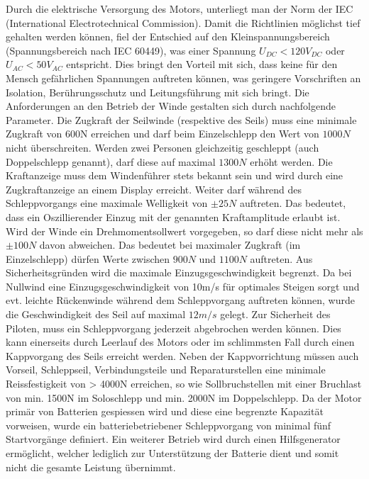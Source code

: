 Durch die elektrische Versorgung des Motors, unterliegt man der Norm der IEC (International Electrotechnical Commission). Damit die Richtlinien möglichst tief gehalten werden können, fiel der Entschied auf den Kleinspannungsbereich (Spannungsbereich  nach IEC 60449), was einer Spannung $U_{DC}<120V_{DC}$ oder $U_{AC}<50V_{AC}$ entspricht. Dies bringt den Vorteil mit sich, dass keine für den Mensch gefährlichen Spannungen auftreten können, was geringere Vorschriften an Isolation, Berührungsschutz und Leitungsführung mit sich bringt.
Die Anforderungen an den Betrieb der Winde gestalten sich durch nachfolgende Parameter. Die Zugkraft der Seilwinde (respektive des Seils) muss eine minimale Zugkraft von 600N erreichen und darf beim Einzelschlepp den Wert von $ 1000N $ nicht überschreiten. Werden zwei Personen gleichzeitig geschleppt (auch Doppelschlepp genannt), darf diese auf maximal $ 1300N $ erhöht werden. Die Kraftanzeige muss dem Windenführer stets bekannt sein und wird durch eine Zugkraftanzeige an einem Display erreicht.
Weiter darf während des Schleppvorgangs eine maximale Welligkeit von $\pm 25N$ auftreten. Das bedeutet, dass ein Oszillierender Einzug mit der genannten Kraftamplitude erlaubt ist. Wird der Winde ein Drehmomentsollwert vorgegeben, so darf diese nicht mehr als $\pm 100N$ davon abweichen. Das bedeutet bei maximaler Zugkraft (im Einzelschlepp) dürfen Werte zwischen $ 900N $ und $ 1100N $ auftreten. Aus Sicherheitsgründen wird die maximale Einzugsgeschwindigkeit begrenzt. Da bei Nullwind eine Einzugsgeschwindigkeit von 10m/s für optimales Steigen sorgt und evt. leichte Rückenwinde während dem Schleppvorgang auftreten können, wurde die Geschwindigkeit des Seil auf maximal $ 12m/s $ gelegt.
Zur Sicherheit des Piloten, muss ein Schleppvorgang jederzeit abgebrochen werden können. Dies kann einerseits durch Leerlauf des Motors oder im schlimmsten Fall durch einen Kappvorgang des Seils erreicht werden. Neben der Kappvorrichtung müssen auch Vorseil, Schleppseil, Verbindungsteile und Reparaturstellen eine minimale Reissfestigkeit von > 4000N erreichen, so wie Sollbruchstellen mit einer Bruchlast von min. 1500N im Soloschlepp und min. 2000N im Doppelschlepp.
Da der Motor primär von Batterien gespiessen wird und diese eine begrenzte Kapazität vorweisen, wurde ein batteriebetriebener Schleppvorgang von minimal fünf Startvorgänge definiert. Ein weiterer Betrieb wird durch einen Hilfsgenerator ermöglicht, welcher lediglich zur Unterstützung der Batterie dient und somit nicht die gesamte Leistung übernimmt.